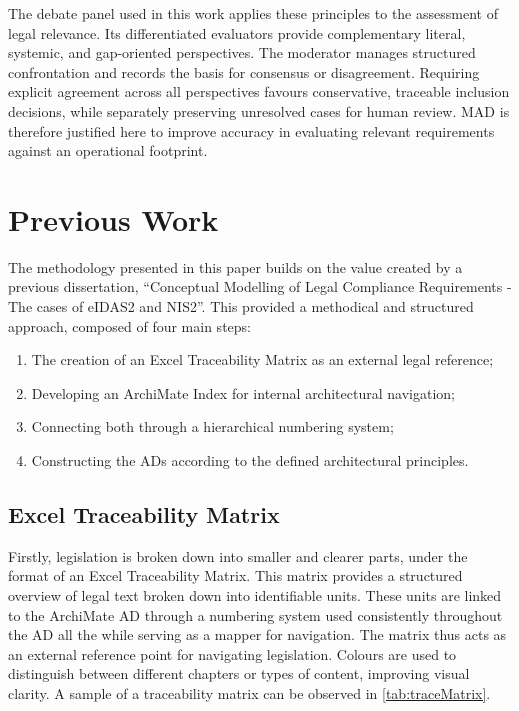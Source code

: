 The debate panel used in this work applies these principles to the assessment of legal relevance. Its differentiated evaluators provide complementary literal, systemic, and gap-oriented perspectives. The moderator manages structured confrontation and records the basis for consensus or disagreement. Requiring explicit agreement across all perspectives favours conservative, traceable inclusion decisions, while separately preserving unresolved cases for human review. \ac{MAD} is therefore justified here to improve accuracy in evaluating relevant requirements against an operational footprint.

\section{Previous Work}

The methodology presented in this paper builds on the value created by a previous dissertation, ``Conceptual Modelling of Legal Compliance Requirements - The cases of eIDAS2 and NIS2''. This provided a methodical and structured approach, composed of four main steps:

\begin{enumerate}
    \item The creation of an Excel Traceability Matrix as an external legal reference;
    \item Developing an ArchiMate Index for internal architectural navigation; 
    \item Connecting both through a hierarchical numbering system;
    \item Constructing the \ac{AD}s according to the defined architectural principles.
\end{enumerate}

\subsection{Excel Traceability Matrix}

Firstly, legislation is broken down into smaller and clearer parts, under the format of an Excel Traceability Matrix. This matrix provides a structured overview of legal text broken down into identifiable units. These units are linked to the ArchiMate \ac{AD} through a numbering system used consistently throughout the \ac{AD} all the while serving as a mapper for navigation. The matrix thus acts as an external reference point for navigating legislation. Colours are used to distinguish between different chapters or types of content, improving visual clarity. A sample of a traceability matrix can be observed in \ref{tab:traceMatrix}.

